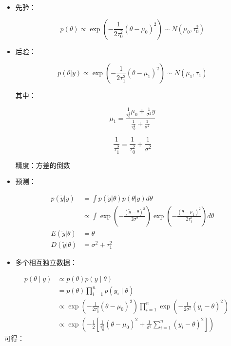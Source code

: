 \begin{itemize}
\item
  先验：

\begin{equation}
  p(\theta)\propto\exp\left(-\frac{1}{2\tau_0^2}(\theta-\mu_0)^2\right)
  \sim N(\mu_0,\tau_0^2)
\end{equation}
\item
  后验：

\begin{equation}
  p(\theta|y)
  \propto\exp\left(-\frac{1}{2\tau_1^2}(\theta-\mu_1)^2\right)
  \sim N(\mu_1,\tau_1)
\end{equation}

  其中：

  \[\mu_1=\frac
  {\frac{1}{\tau_0^2}\mu_0+\frac{1}{\sigma^2}y}
  {\frac{1}{\tau_0^2}+\frac{1}{\sigma^2}}\]

  \[\frac{1}{\tau_1^2}=\frac{1}{\tau_0^2}+\frac{1}{\sigma^2}\]

  精度：方差的倒数
\item
  预测：

\begin{equation}
  \begin{aligned}
    p(\widetilde y|y)&=\int p(\widetilde y | \theta)p(\theta|y)d\theta\\
    &\propto
    \int\exp\left(-\frac{(\widetilde y - \theta)^2}{2\sigma^2}\right)
    \exp \left(-\frac{(\theta-\mu_1)^2}{2\tau_1^2}\right)d\theta\\
    E(\widetilde y|\theta)&=\theta\\
    D(\widetilde y|\theta)&=\sigma^2+\tau^2_1
    \end{aligned}
\end{equation}

\item
  多个相互独立数据：
\end{itemize}


\begin{equation}
  \begin{aligned}
  p(\theta \mid y) & \propto p(\theta) p(y \mid \theta) 
  \\&=p(\theta) \prod_{i=1}^{n} p\left(y_{i} \mid \theta\right) 
  \\& \propto \exp \left(-\frac{1}{2 \tau_{0}^{2}}\left(\theta-\mu_{0}\right)^{2}\right) \prod_{i=1}^{n} \exp \left(-\frac{1}{2 \sigma^{2}}\left(y_{i}-\theta\right)^{2}\right) 
  \\& \propto \exp \left(-\frac{1}{2}\left[\frac{1}{\tau_{0}^{2}}\left(\theta-\mu_{0}\right)^{2}+\frac{1}{\sigma^{2}} \sum_{i=1}^{n}\left(y_{i}-\theta\right)^{2}\right]\right)
  \end{aligned}
\end{equation}
可得：

